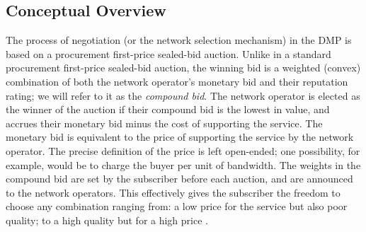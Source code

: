 \subsection{Conceptual Overview} %
\label{sub:conceptual_overview_dmp}
The process of negotiation (or the network selection mechanism) in the DMP is based on a procurement first-price sealed-bid auction. Unlike in a standard procurement first-price sealed-bid auction, the winning bid is a weighted (convex) combination of both the network operator's monetary bid and their reputation rating; we will refer to it as the \emph{compound bid}. The network operator is elected as the winner of the auction if their compound bid is the lowest in value, and accrues their monetary bid minus the cost of supporting the service. The monetary bid is equivalent to the price of supporting the service by the network operator. The precise definition of the price is left open-ended; one possibility, for example, would be to charge the buyer per unit of bandwidth. The weights in the compound bid are set by the subscriber before each auction, and are announced to the network operators. This effectively gives the subscriber the freedom to choose any combination ranging from: a low price for the service but also poor quality; to a high quality but for a high price \cite{DMLeBodic00}.

